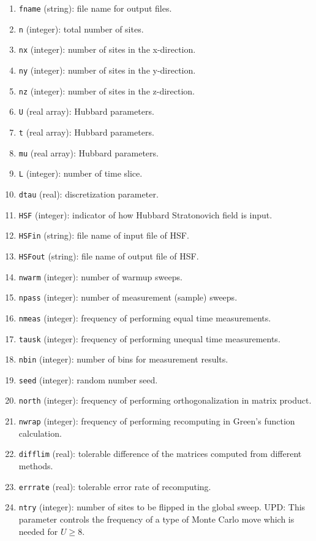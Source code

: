 \documentclass[12pt]{article}
\begin{document}
\begin{enumerate}
  \item \verb"fname" (string): file name for output files.
  \item \verb"n" (integer): total number of sites.
  \item \verb"nx" (integer): number of sites in the x-direction.
  \item \verb"ny" (integer): number of sites in the y-direction.
  \item \verb"nz" (integer): number of sites in the z-direction.
  \item \verb"U" (real array): Hubbard parameters.
  \item \verb"t" (real array): Hubbard parameters.
  \item \verb"mu" (real array): Hubbard parameters.
  \item \verb"L" (integer): number of time slice.
  \item \verb"dtau" (real): discretization parameter.
  \item \verb"HSF" (integer): indicator of how Hubbard Stratonovich field is input.
  \item \verb"HSFin" (string): file name of input file of HSF.
  \item \verb"HSFout" (string): file name of output file of HSF.
  \item \verb"nwarm" (integer): number of warmup sweeps.
  \item \verb"npass" (integer): number of measurement (sample) sweeps.
  \item \verb"nmeas" (integer): frequency of performing equal time measurements.
  \item \verb"tausk" (integer): frequency of performing unequal time measurements.
  \item \verb"nbin" (integer): number of bins for measurement results.
  \item \verb"seed" (integer): random number seed.
  \item \verb"north" (integer): frequency of performing orthogonalization in matrix product.
  \item \verb"nwrap" (integer): frequency of performing recomputing in Green's function calculation.
  \item \verb"difflim" (real): tolerable difference of the matrices computed from different methods.
  \item \verb"errrate" (real): tolerable error rate of recomputing.
  \item \verb"ntry" (integer): number of sites to be flipped in the global sweep. UPD: This parameter controls the frequency of
  a type of Monte Carlo move which is needed for $U \geq 8$.
\end{enumerate}
\end{document}
